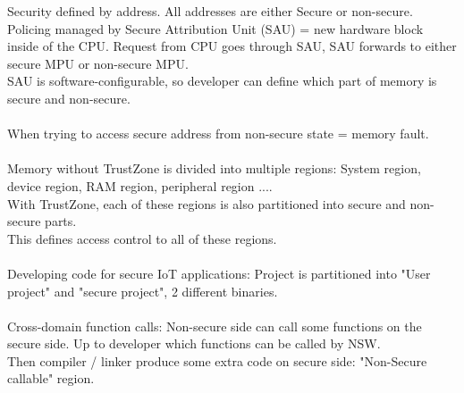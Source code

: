 Security defined by address. All addresses are either Secure or non-secure. \\
Policing managed by Secure Attribution Unit (SAU) = new hardware block inside of the CPU. 
Request from CPU goes through SAU, SAU forwards to either secure MPU or non-secure MPU.\\
SAU is software-configurable, so developer can define which part of memory is secure and non-secure.\\
\\
When trying to access secure address from non-secure state = memory fault.\\
\\ 
Memory without TrustZone is divided into multiple regions: System region, device region, RAM region, peripheral region .... \\
With TrustZone, each of these regions is also partitioned into secure and non-secure parts. \\
This defines access control to all of these regions.\\ 
\\
Developing code for secure IoT applications: Project is partitioned into "User project" and "secure project", 2 different binaries.\\ 
\\
Cross-domain function calls: Non-secure side can call some functions on the secure side. Up to developer which functions can be called by NSW.\\
Then compiler / linker produce some extra code on secure side: "Non-Secure callable" region. \\ 

